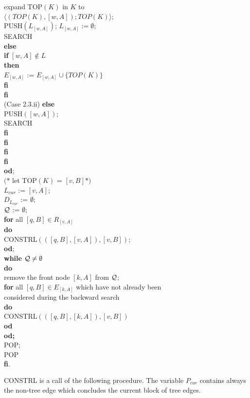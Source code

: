 \documentclass[12pt,twoside,a4paper]{article}
\begin{document}
\begin{tabbing}
\> \> \> \> \> \> \> \> expand TOP$(K)$ in $K$ to \\
\> \> \> \> \> \> \> \> $\langle (TOP(K),[w,A]);TOP(K)\rangle$; \\
\> \> \> \> \> \> \> \> PUSH$(L_{[w,A]})$; $L_{[w,A]} := \emptyset$;\\
\> \> \> \> \> \> \> \> SEARCH \\
\> \> \> \> \> \> \> {\bf else} \\
\> \> \> \> \> \> \> \> {\bf if} $[w,A] \not\in L$ \\
\> \> \> \> \> \> \> \> {\bf then} \\
\> \> \> \> \> \> \> \> \> $E_{[w,A]}$ := $E_{[w,A]}\cup \{TOP(K)\}$ \\
\> \> \> \> \> \> \> \> {\bf fi} \\
\> \> \> \> \> \> \> {\bf fi} \\
(Case 2.3.ii) \> \> \> \> \> \> {\bf else} \\
\> \> \> \> \> \> \> PUSH$([w,A])$; \\
\> \> \> \> \> \> \> SEARCH \\
\> \> \> \> \> \> {\bf fi} \\
\> \> \> \> \> {\bf fi} \\
\> \> \> \> {\bf fi} \\
\> \> \> {\bf fi} \\
\> \> {\bf od}; \\ 
\> \> $(\ast$ let TOP$(K)$ = $[v,B] \ast)$ \\
\> \> $L_{cur}$ := $[v,A]$; \\
\> \> $D_{L_{cur}}$ := $\emptyset$; \\
\> \> $\cal{Q}$ := $\emptyset$; \\
\> \> {\bf for} all $[q,B] \in R_{[v,A]}$ \\
\> \> {\bf do} \\
\> \> \> CONSTRL$(([q,B],[v,A]),[v,B])$; \\
\> \> {\bf od}; \\
\> \> {\bf while} $\cal{Q} \not= \emptyset$ \\
\> \> {\bf do} \\
\> \> \> remove the front node $[k,A]$ from $\cal{Q}$; \\
\> \> \> {\bf for} all $[q,B] \in E_{[k,A]}$ which have not already been \\
\> \> \> \> considered during the backward search \\
\> \> \> {\bf do} \\
\> \> \> \> CONSTRL$(([q,B],[k,A]),[v,B])$ \\
\> \> \> {\bf od} \\
\> \> {\bf od;} \\
\> POP; \\
\> POP \\
{\bf fi}. \\
\end{tabbing}
\vspace{-.3cm}
\noindent
CONSTRL is a call of the following procedure. The variable $P_{cur}$ contains 
always the non-tree edge which concludes the current block of tree edges.
\end{document}
